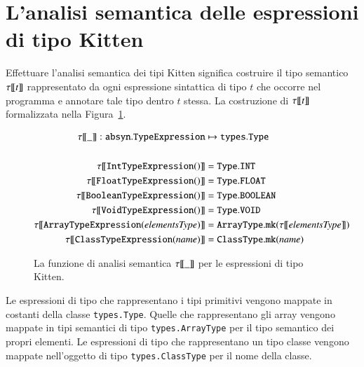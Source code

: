 \section{L'analisi semantica delle espressioni di tipo Kitten}\label{sec:analysis_types}
%
Effettuare l'analisi semantica dei tipi Kitten significa costruire il tipo
semantico ${\tau[\![{t}]\!]}$ rappresentato da ogni espressione sintattica di tipo $t$
che occorre nel programma e annotare tale tipo dentro $t$ stessa. La
costruzione di ${\tau[\![{t}]\!]}$ \e formalizzata nella Figura~\ref{fig:analysis_types}.
%
\begin{figure}
\begin{align*}
  \st{\_}:\mathtt{absyn.TypeExpression}&\mapsto\mathtt{types.Type}\\
  \mbox{}\\
  \st{\mathtt{IntTypeExpression()}}&=\mathtt{Type.INT}\\
  \st{\mathtt{FloatTypeExpression()}}&=\mathtt{Type.FLOAT}\\
  \st{\mathtt{BooleanTypeExpression()}}&=\mathtt{Type.BOOLEAN}\\
  \st{\mathtt{VoidTypeExpression()}}&=\mathtt{Type.VOID}\\
  \st{\mathtt{ArrayTypeExpression(\mathit{elementsType})}}
    &=\mathtt{ArrayType.mk(\st{\mathit{elementsType}})}\\
  \st{\mathtt{ClassTypeExpression(\mathit{name})}}
    &=\mathtt{ClassType.mk(\mathit{name})}
\end{align*}
\caption{La funzione di analisi semantica ${\tau[\![{\_}]\!]}$ per le espressioni di tipo Kitten.}\label{fig:analysis_types}
\end{figure}
%
Le espressioni di tipo che rappresentano i tipi primitivi
vengono mappate in costanti della classe
\texttt{types.Type}. Quelle che rappresentano gli array
vengono mappate in tipi semantici di tipo \texttt{types.ArrayType} per
il tipo semantico dei propri elementi.
Le espressioni di tipo che rappresentano un tipo classe vengono mappate
nell'oggetto di tipo \texttt{types.ClassType} per il nome della classe.

